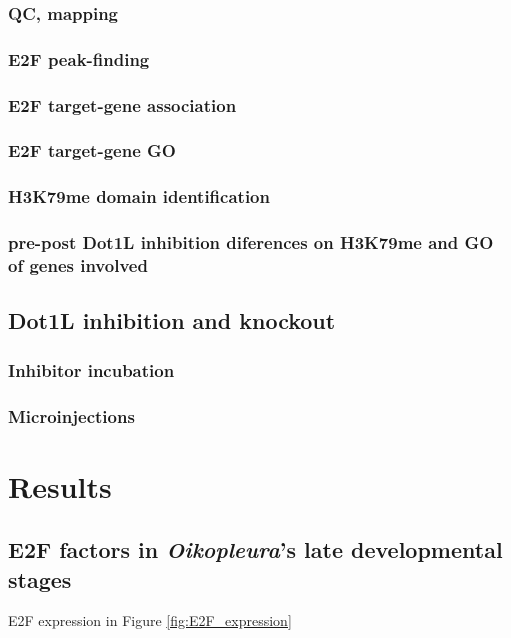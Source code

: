 \documentclass[11pt,twoside,a4paper]{report}
\begin{document}
		\subsection{QC, mapping}
		\subsection{E2F peak-finding}
		\subsection{E2F target-gene association}
		\subsection{E2F target-gene GO}
		\subsection{H3K79me domain identification}
		\subsection{pre-post Dot1L inhibition diferences on H3K79me and GO of genes involved}

	\section{Dot1L inhibition and knockout}
		\subsection{Inhibitor incubation}
		\subsection{Microinjections}


\clearpage


\chapter{Results}

\section{E2F factors in \textit{Oikopleura}'s late developmental stages}

	E2F expression in Figure \ref{fig:E2F_expression}
	
\end{document}
